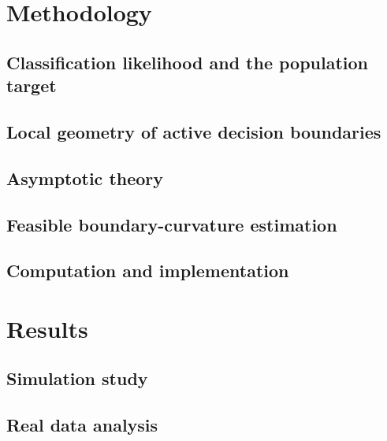 \documentclass[numsec,webpdf,modern,medium,namedate]{oup-authoring-template}
\theoremstyle{plain}
\theoremstyle{definition}
\theoremstyle{remark}
\begin{document}
\section{Methodology}
\label{sec:methodology}

\subsection{Classification likelihood and the population target}
\label{sec:framework}


\subsection{Local geometry of active decision boundaries}
\label{sec:geometry}


\subsection{Asymptotic theory}
\label{sec:theory}



\subsection{Feasible boundary-curvature estimation}
\label{sec:estimation}


\subsection{Computation and implementation}
\label{sec:computation}


\section{Results}
\label{sec:results}

\subsection{Simulation study}
\label{sec:simulations}


\subsection{Real data analysis}
\label{sec:applications}

\end{document}
